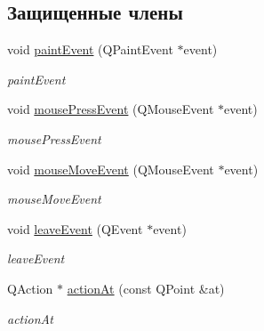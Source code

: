 \subsection*{Защищенные члены}
\begin{DoxyCompactItemize}
\item 
void \hyperlink{classSideBar_a99c8319ee78b2197db5eda7b2cd232a1}{paint\+Event} (Q\+Paint\+Event $\ast$event)
\begin{DoxyCompactList}\small\item\em paint\+Event \end{DoxyCompactList}\item 
void \hyperlink{classSideBar_ae3923b2d85345b3f7b899ce6becd21fb}{mouse\+Press\+Event} (Q\+Mouse\+Event $\ast$event)
\begin{DoxyCompactList}\small\item\em mouse\+Press\+Event \end{DoxyCompactList}\item 
void \hyperlink{classSideBar_a1c00fa33ba20510bf7d50dfa757a8515}{mouse\+Move\+Event} (Q\+Mouse\+Event $\ast$event)
\begin{DoxyCompactList}\small\item\em mouse\+Move\+Event \end{DoxyCompactList}\item 
void \hyperlink{classSideBar_a123dcd87817fecdfacd60fd967044908}{leave\+Event} (Q\+Event $\ast$event)
\begin{DoxyCompactList}\small\item\em leave\+Event \end{DoxyCompactList}\item 
Q\+Action $\ast$ \hyperlink{classSideBar_a003659c2c40670c3f2bb31798ff87c3d}{action\+At} (const Q\+Point \&at)
\begin{DoxyCompactList}\small\item\em action\+At \end{DoxyCompactList}\end{DoxyCompactItemize}

